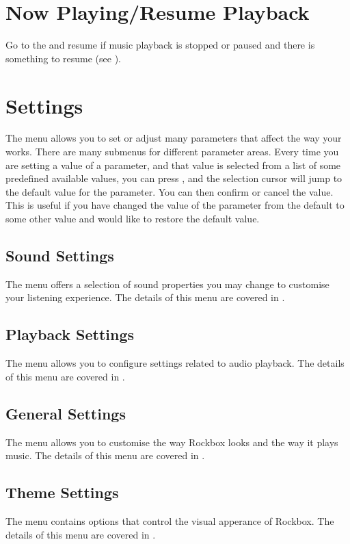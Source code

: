 \section{Now Playing/Resume Playback}
Go to the  and resume if music playback is
stopped or paused and there is something to resume (see ).

\section{Settings}

The  menu allows you to set or adjust many parameters that
affect the way your \dap{} works. There are many submenus for different
parameter areas. Every time you are setting a value of a parameter, and that
value is selected from a list of some predefined available values, you can press
\ActionStdContext, and the selection cursor will jump to the default value for
the parameter. You can then confirm or cancel the value. This is useful if you
have changed the value of the parameter from the default to some other value and
would like to restore the default value.

\subsection{Sound Settings}
The  menu offers a selection of sound properties you may 
change to customise your listening experience. The details of this menu are covered
in .

\subsection{Playback Settings}
The  menu allows you to configure settings related
to audio playback. The details of this menu are covered
in .

\subsection{General Settings}
The  menu allows you to customise the way Rockbox looks 
and the way it plays music. The details of this menu are covered in
.

\subsection{Theme Settings}
The  menu contains options that control the visual
apperance of Rockbox. The details of this menu are covered in
.

